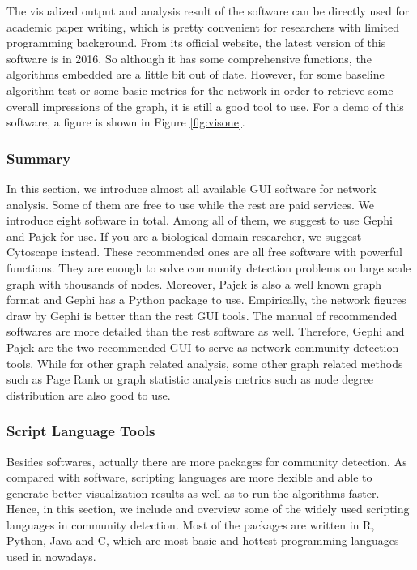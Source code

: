The visualized output and analysis result of the software can be directly used for academic paper writing, which is pretty convenient for researchers with limited programming background. From its official website, the latest version of this software is in 2016. So although it has some comprehensive functions, the algorithms embedded are a little bit out of date. However, for some baseline algorithm test or some basic metrics for the network in order to retrieve some overall impressions of the graph, it is still a good tool to use. For a demo of this software, a figure is shown in Figure \ref{fig:visone}. 

\subsubsection{Summary}
In this section, we introduce almost all available GUI software for  network analysis. Some of them are free to use while the rest are paid services. We introduce eight software in total. Among all of them, we suggest to use Gephi and Pajek for use. If you are a biological domain researcher, we suggest Cytoscape instead.  These recommended ones are all free software with powerful functions. They are enough to solve community detection problems on large scale graph with thousands of nodes. Moreover, Pajek is also a well known graph format and Gephi has a Python package to use. Empirically, the network figures draw by Gephi is better than the rest GUI tools. The manual of recommended softwares are more detailed than the rest software as well. Therefore, Gephi and Pajek are the two recommended GUI to serve as network community detection tools. While for other graph related analysis, some other graph related methods such as Page Rank or graph statistic analysis metrics such as node degree distribution are also good to use.

\subsubsection{Script Language Tools}

Besides softwares, actually there are more packages for community detection. As compared with software, scripting languages are more flexible and able to generate better visualization results as well as to run the algorithms faster. Hence, in this section, we include and overview some of the widely used scripting languages in community detection. Most of the packages are written in R, Python, Java and C, which are most basic and hottest programming languages used in nowadays. 

